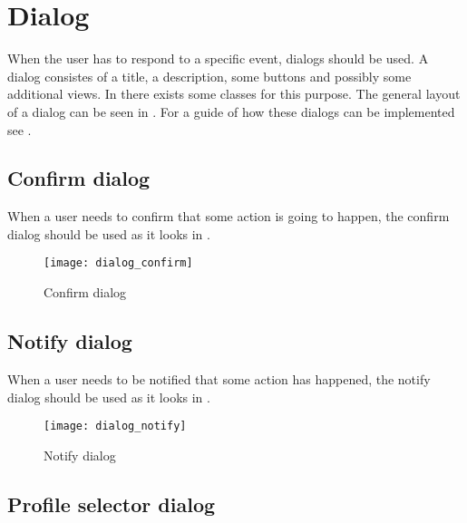 
\chapter{Dialog}
\label{cha:dialog}

When the user has to respond to a specific event, dialogs should be used. A dialog consistes of a title, a description, some buttons and possibly some additional views. In \gc there exists some classes for this purpose. The general layout of a dialog can be seen in . For a guide of how these dialogs can be implemented see .

\section{Confirm dialog}
\label{sec:confirm_dialog}

When a user needs to confirm that some action is going to happen, the confirm dialog should be used as it looks in .

\begin{figure}[h]
	\centering
	\texttt{[image: dialog\_confirm]}
	\caption{Confirm dialog}
	\label{fig:confirm_dialog}
\end{figure}
\FloatBarrier

\section{Notify dialog}
\label{sec:notify_dialog}

When a user needs to be notified that some action has happened, the notify dialog should be used as it looks in .
\begin{figure}[h]
	\centering
	\texttt{[image: dialog\_notify]}
	\caption{Notify dialog}
	\label{fig:notify_dialog}
\end{figure}
\FloatBarrier

\section{Profile selector dialog}
\label{sec:profileselector_dialog}

